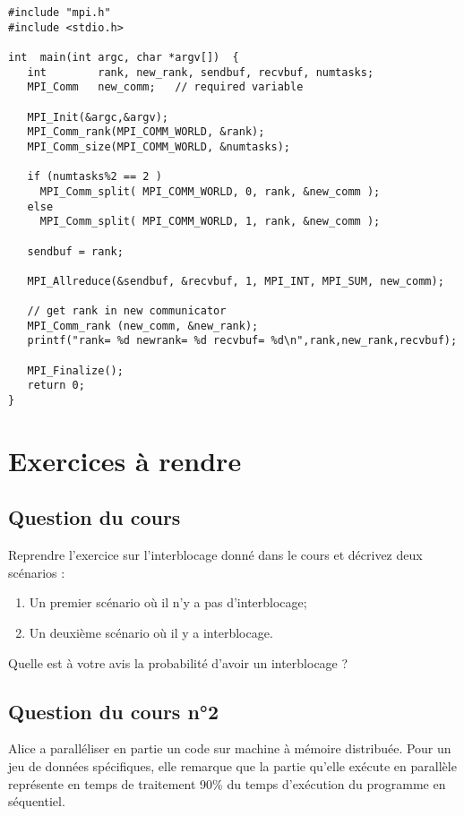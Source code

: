 \documentclass[11pt,a4paper]{article}
\begin{document}
\begin{lstlisting}
#include "mpi.h"
#include <stdio.h>

int  main(int argc, char *argv[])  {
   int        rank, new_rank, sendbuf, recvbuf, numtasks;
   MPI_Comm   new_comm;   // required variable

   MPI_Init(&argc,&argv);
   MPI_Comm_rank(MPI_COMM_WORLD, &rank);
   MPI_Comm_size(MPI_COMM_WORLD, &numtasks);

   if (numtasks%2 == 2 )
     MPI_Comm_split( MPI_COMM_WORLD, 0, rank, &new_comm );
   else
     MPI_Comm_split( MPI_COMM_WORLD, 1, rank, &new_comm );

   sendbuf = rank;

   MPI_Allreduce(&sendbuf, &recvbuf, 1, MPI_INT, MPI_SUM, new_comm);

   // get rank in new communicator
   MPI_Comm_rank (new_comm, &new_rank);
   printf("rank= %d newrank= %d recvbuf= %d\n",rank,new_rank,recvbuf);

   MPI_Finalize();
   return 0;
}
\end{lstlisting}

\section{Exercices à rendre}

\subsection{Question du cours}

Reprendre l'exercice sur l'interblocage donné dans le cours et décrivez deux scénarios :
\begin{enumerate}
    \item Un premier scénario où il n'y a pas d'interblocage;
    \item Un deuxième scénario où il y a interblocage.
\end{enumerate}

Quelle est à votre avis la probabilité d'avoir un interblocage ?

\subsection{Question du cours n°2}

Alice a paralléliser en partie un code sur machine à mémoire distribuée. Pour un jeu de données spécifiques,
elle remarque que la partie qu'elle exécute en parallèle représente en temps de traitement 90\% du
temps d'exécution du programme en séquentiel.
\end{document}

